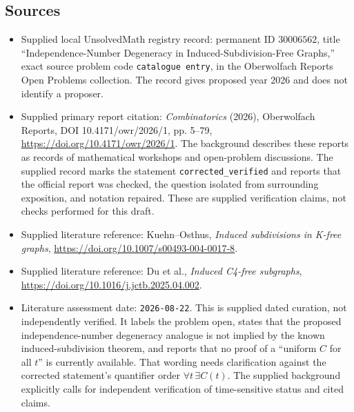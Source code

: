 \documentclass[11pt]{article}
\begin{document}
\subsection{Sources}
\begin{itemize}
\item Supplied local UnsolvedMath registry record: permanent ID \(30006562\), title ``Independence-Number Degeneracy in Induced-Subdivision-Free Graphs,'' exact source problem code \texttt{catalogue entry}, in the Oberwolfach Reports Open Problems collection. The record gives proposed year 2026 and does not identify a proposer.
\item Supplied primary report citation: \emph{Combinatorics} (2026), Oberwolfach Reports, DOI 10.4171/owr/2026/1, pp. 5--79, \url{https://doi.org/10.4171/owr/2026/1}. The background describes these reports as records of mathematical workshops and open-problem discussions. The supplied record marks the statement \texttt{corrected\_verified} and reports that the official report was checked, the question isolated from surrounding exposition, and notation repaired. These are supplied verification claims, not checks performed for this draft.
\item Supplied literature reference: Kuehn--Osthus, \emph{Induced subdivisions in K-free graphs}, \url{https://doi.org/10.1007/s00493-004-0017-8}.
\item Supplied literature reference: Du et al., \emph{Induced C4-free subgraphs}, \url{https://doi.org/10.1016/j.jctb.2025.04.002}.
\item Literature assessment date: \texttt{2026-08-22}. This is supplied dated curation, not independently verified. It labels the problem open, states that the proposed independence-number degeneracy analogue is not implied by the known induced-subdivision theorem, and reports that no proof of a ``uniform \(C\) for all \(t\)'' is currently available. That wording needs clarification against the corrected statement's quantifier order \(\forall t\,\exists C(t)\). The supplied background explicitly calls for independent verification of time-sensitive status and cited claims.
\end{itemize}
\end{document}
